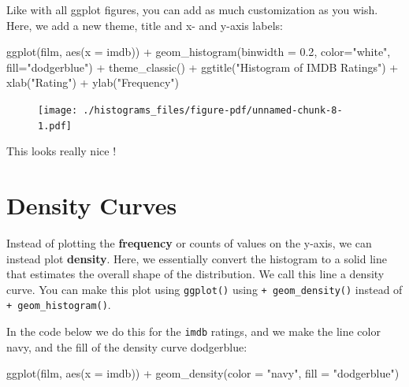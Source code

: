 \documentclass[
  letterpaper,
  DIV=11,
  numbers=noendperiod]{scrreprt}
\newenvironment{Shaded}{\begin{snugshade}}{\end{snugshade}}
\newcommand{\AttributeTok}[1]{\textcolor[rgb]{0.40,0.45,0.13}{#1}}
\newcommand{\FloatTok}[1]{\textcolor[rgb]{0.68,0.00,0.00}{#1}}
\newcommand{\FunctionTok}[1]{\textcolor[rgb]{0.28,0.35,0.67}{#1}}
\newcommand{\NormalTok}[1]{\textcolor[rgb]{0.00,0.23,0.31}{#1}}
\newcommand{\SpecialCharTok}[1]{\textcolor[rgb]{0.37,0.37,0.37}{#1}}
\newcommand{\StringTok}[1]{\textcolor[rgb]{0.13,0.47,0.30}{#1}}
\begin{document}
Like with all ggplot figures, you can add as much customization as you
wish. Here, we add a new theme, title and x- and y-axis labels:

\begin{Shaded}
\begin{Highlighting}[]
\FunctionTok{ggplot}\NormalTok{(film, }\FunctionTok{aes}\NormalTok{(}\AttributeTok{x =}\NormalTok{ imdb)) }\SpecialCharTok{+} 
  \FunctionTok{geom\_histogram}\NormalTok{(}\AttributeTok{binwidth =} \FloatTok{0.2}\NormalTok{, }\AttributeTok{color=}\StringTok{"white"}\NormalTok{, }\AttributeTok{fill=}\StringTok{"dodgerblue"}\NormalTok{) }\SpecialCharTok{+}
  \FunctionTok{theme\_classic}\NormalTok{() }\SpecialCharTok{+}
  \FunctionTok{ggtitle}\NormalTok{(}\StringTok{"Histogram of IMDB Ratings"}\NormalTok{) }\SpecialCharTok{+}
  \FunctionTok{xlab}\NormalTok{(}\StringTok{"Rating"}\NormalTok{) }\SpecialCharTok{+}
  \FunctionTok{ylab}\NormalTok{(}\StringTok{"Frequency"}\NormalTok{)}
\end{Highlighting}
\end{Shaded}

\begin{figure}[H]

{\centering \texttt{[image: ./histograms\_files/figure-pdf/unnamed-chunk-8-1.pdf]}

}

\end{figure}

This looks really nice !

\hypertarget{density-curves}{%
\section{Density Curves}\label{density-curves}}

Instead of plotting the \textbf{frequency} or counts of values on the
y-axis, we can instead plot \textbf{density}. Here, we essentially
convert the histogram to a solid line that estimates the overall shape
of the distribution. We call this line a density curve. You can make
this plot using \texttt{ggplot()} using \texttt{+\ geom\_density()}
instead of \texttt{+\ geom\_histogram()}.

In the code below we do this for the \texttt{imdb} ratings, and we make
the line color navy, and the fill of the density curve dodgerblue:

\begin{Shaded}
\begin{Highlighting}[]
\FunctionTok{ggplot}\NormalTok{(film, }\FunctionTok{aes}\NormalTok{(}\AttributeTok{x =}\NormalTok{ imdb)) }\SpecialCharTok{+} 
  \FunctionTok{geom\_density}\NormalTok{(}\AttributeTok{color =} \StringTok{"navy"}\NormalTok{, }\AttributeTok{fill =} \StringTok{"dodgerblue"}\NormalTok{) }
\end{Highlighting}
\end{Shaded}
\end{document}
